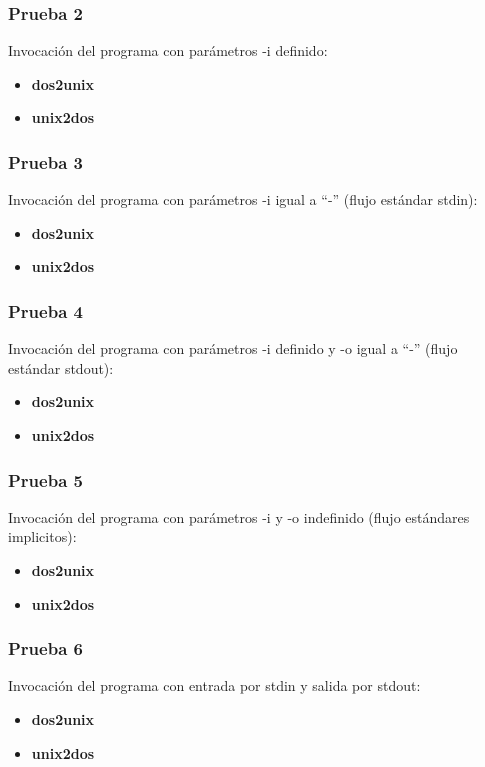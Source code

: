 \documentclass[a4paper,10pt]{article}
\begin{document}
    \subsubsection{Prueba 2}
    Invocaci\'on del programa con par\'ametros -i definido:
    \begin{itemize}
      \item \textbf{dos2unix}
      \item \textbf{unix2dos}
    \end{itemize}
  
    \subsubsection{Prueba 3}
    Invocaci\'on del programa con par\'ametros -i igual a ``-'' (flujo est\'andar stdin):
      \begin{itemize}
      \item \textbf{dos2unix}
      \item \textbf{unix2dos}
      \end{itemize}

    \subsubsection{Prueba 4}
    Invocaci\'on del programa con par\'ametros -i definido y -o igual a ``-'' (flujo est\'andar stdout):
      \begin{itemize}
      \item \textbf{dos2unix}
      \item \textbf{unix2dos}
      \end{itemize}

    \subsubsection{Prueba 5}
    Invocaci\'on del programa con par\'ametros -i y -o indefinido (flujo est\'andares implicitos):
      \begin{itemize}
      \item \textbf{dos2unix}
      \item \textbf{unix2dos}
      \end{itemize}

    \subsubsection{Prueba 6}
    Invocaci\'on del programa con entrada por stdin y salida por stdout:
      \begin{itemize}
      \item \textbf{dos2unix}
      \item \textbf{unix2dos}
      \end{itemize}
\end{document}
